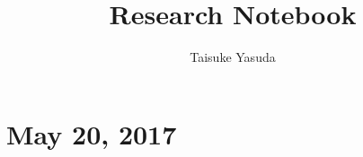 \documentclass{article}
\title{Research Notebook}
\author{Taisuke Yasuda}
\begin{document}
\maketitle

\section{May 20, 2017}
\end{document}
